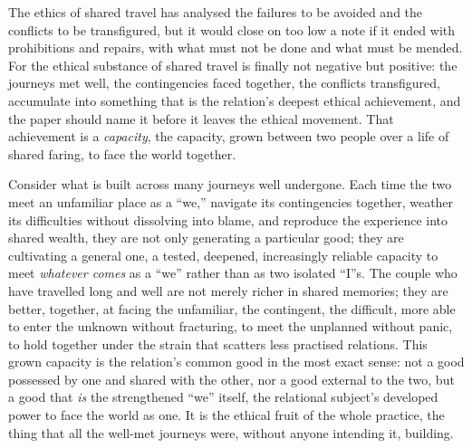 The ethics of shared travel has analysed the failures to be avoided and the conflicts to be transfigured, but it would close on too low a note if it ended with prohibitions and repairs, with what must not be done and what must be mended. For the ethical substance of shared travel is finally not negative but positive: the journeys met well, the contingencies faced together, the conflicts transfigured, accumulate into something that is the relation's deepest ethical achievement, and the paper should name it before it leaves the ethical movement. That achievement is a \emph{capacity}, the capacity, grown between two people over a life of shared faring, to face the world together.

Consider what is built across many journeys well undergone. Each time the two meet an unfamiliar place as a ``we,'' navigate its contingencies together, weather its difficulties without dissolving into blame, and reproduce the experience into shared wealth, they are not only generating a particular good; they are cultivating a general one, a tested, deepened, increasingly reliable capacity to meet \emph{whatever comes} as a ``we'' rather than as two isolated ``I''s. The couple who have travelled long and well are not merely richer in shared memories; they are better, together, at facing the unfamiliar, the contingent, the difficult, more able to enter the unknown without fracturing, to meet the unplanned without panic, to hold together under the strain that scatters less practised relations. This grown capacity is the relation's common good in the most exact sense: not a good possessed by one and shared with the other, nor a good external to the two, but a good that \emph{is} the strengthened ``we'' itself, the relational subject's developed power to face the world as one. It is the ethical fruit of the whole practice, the thing that all the well-met journeys were, without anyone intending it, building.

